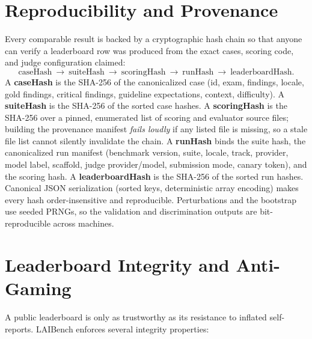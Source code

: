 \documentclass[11pt]{article}
\begin{document}
\section{Reproducibility and Provenance}
\label{sec:provenance}

Every comparable result is backed by a cryptographic hash chain so that anyone
can verify a leaderboard row was produced from the exact cases, scoring code, and
judge configuration claimed:
\[
\text{caseHash}\ \rightarrow\ \text{suiteHash}\ \rightarrow\ \text{scoringHash}\ \rightarrow\ \text{runHash}\ \rightarrow\ \text{leaderboardHash}.
\]
A \textbf{caseHash} is the SHA-256 of the canonicalized case (id, exam, findings,
locale, gold findings, critical findings, guideline expectations, context,
difficulty). A \textbf{suiteHash} is the SHA-256 of the sorted case hashes. A
\textbf{scoringHash} is the SHA-256 over a pinned, enumerated list of scoring and
evaluator source files; building the provenance manifest \emph{fails loudly} if
any listed file is missing, so a stale file list cannot silently invalidate the
chain. A \textbf{runHash} binds the suite hash, the canonicalized run manifest
(benchmark version, suite, locale, track, provider, model label, scaffold, judge
provider/model, submission mode, canary token), and the scoring hash. A
\textbf{leaderboardHash} is the SHA-256 of the sorted run hashes. Canonical JSON
serialization (sorted keys, deterministic array encoding) makes every hash
order-insensitive and reproducible. Perturbations and the bootstrap use seeded
PRNGs, so the validation and discrimination outputs are bit-reproducible across
machines.

\section{Leaderboard Integrity and Anti-Gaming}
\label{sec:integrity}

A public leaderboard is only as trustworthy as its resistance to inflated
self-reports. LAIBench enforces several integrity properties:
\end{document}
